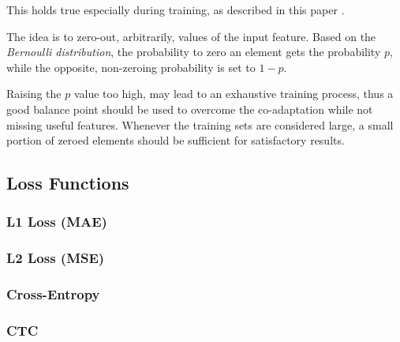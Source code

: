 This holds true especially during training, as described in this paper
\citep{hinton2012improving}.

The idea is to zero-out, arbitrarily, values of
the input feature.
Based on the \emph{Bernoulli distribution}, the probability to zero an element gets the
probability \(p\), while the opposite, non-zeroing probability is set to \(1-p\).

Raising the \(p\) value too high, may lead to an exhaustive training process, thus
a good balance point should be used to overcome the co-adaptation while not missing
useful features. Whenever the training sets are considered large, a small portion
of zeroed elements should be sufficient for satisfactory results.

\subsection{Loss Functions}
\subsubsection{L1 Loss (MAE)}
\subsubsection{L2 Loss (MSE)}
\subsubsection{Cross-Entropy}
\subsubsection{CTC}